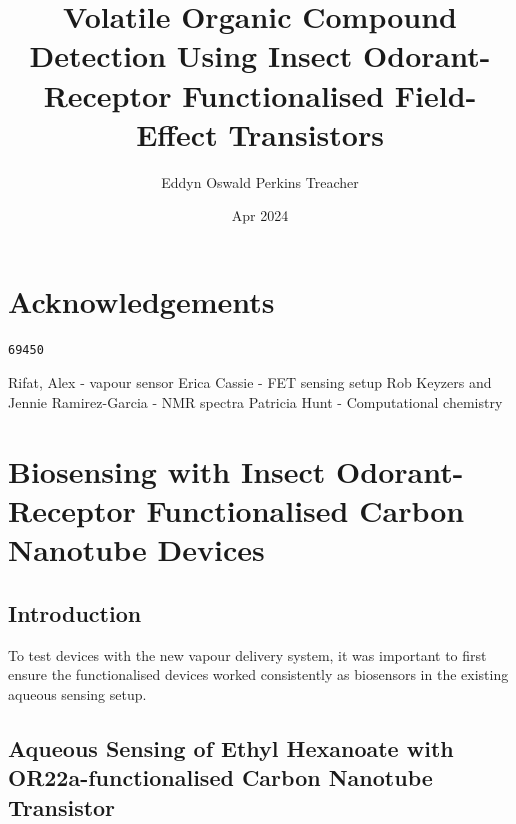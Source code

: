 \documentclass[
  a4paper,
]{scrbook}
\title{Volatile Organic Compound Detection Using Insect Odorant-Receptor
Functionalised Field-Effect Transistors}
\author{Eddyn Oswald Perkins Treacher}
\date{Apr 2024}
\renewcommand*\contentsname{Table of contents}
\newcommand\contentsname{Table of contents}
\begin{document}
\frontmatter
\maketitle
\ifdefined\Shaded\renewenvironment{Shaded}{\begin{tcolorbox}[frame hidden, borderline west={3pt}{0pt}{shadecolor}, breakable, sharp corners, enhanced, boxrule=0pt, interior hidden]}{\end{tcolorbox}}\fi

\renewcommand*\contentsname{Table of contents}
{
\setcounter{tocdepth}{2}
\tableofcontents
}
\mainmatter
{}

\hypertarget{acknowledgements}{%
\chapter*{Acknowledgements}\label{acknowledgements}}


\begin{verbatim}
69450
\end{verbatim}

Rifat, Alex - vapour sensor Erica Cassie - FET sensing setup Rob Keyzers
and Jennie Ramirez-Garcia - NMR spectra Patricia Hunt - Computational
chemistry


\hypertarget{biosensing-with-insect-odorant-receptor-functionalised-carbon-nanotube-devices}{%
\chapter{Biosensing with Insect Odorant-Receptor Functionalised Carbon
Nanotube
Devices}\label{biosensing-with-insect-odorant-receptor-functionalised-carbon-nanotube-devices}}

\hypertarget{introduction}{%
\section{Introduction}\label{introduction}}

To test devices with the new vapour delivery system, it was important to
first ensure the functionalised devices worked consistently as
biosensors in the existing aqueous sensing setup.

\hypertarget{sec-aqueous-sensing-EtHex}{%
\section{Aqueous Sensing of Ethyl Hexanoate with OR22a-functionalised
Carbon Nanotube Transistor}\label{sec-aqueous-sensing-EtHex}}
\end{document}
